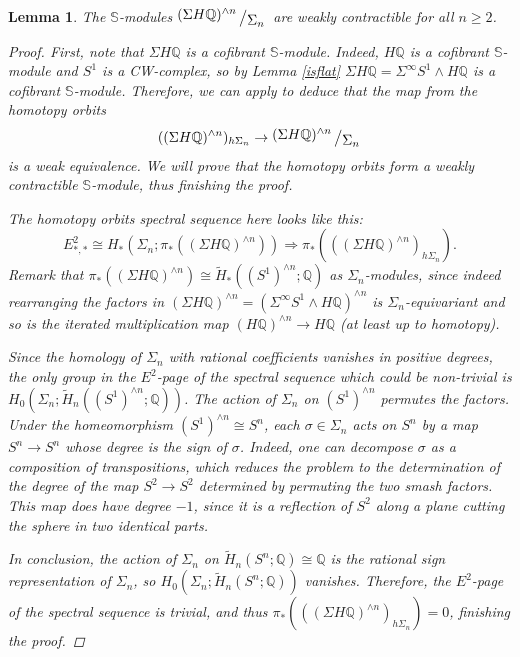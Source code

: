 \documentclass[a4paper,11pt]{amsart} %
\theoremstyle{definition} \newtheorem{defn}[equation]{Definition}
\theoremstyle{remark} \newtheorem{notation}[equation]{Notation}
\theoremstyle{plain} \newtheorem{teo}[equation]{Theorem}
\theoremstyle{plain} \newtheorem{lema}[equation]{Lemma}
\theoremstyle{plain} \newtheorem{prop}[equation]{Proposition}
\theoremstyle{plain} \newtheorem{corolario}[equation]{Corollary}
\theoremstyle{remark} \newtheorem{obs}[equation]{Remark}
\theoremstyle{remark} \newtheorem{sideobs}[equation]{Side remark}
\theoremstyle{remark} \newtheorem{ejercicio}[equation]{Exercise}
\theoremstyle{definition} \newtheorem{notn}[equation]{Notation}
\theoremstyle{remark} \newtheorem{ej}[equation]{Example}
\theoremstyle{remark} \newtheorem{contraej}[equation]{Counterexample}
\theoremstyle{plain} \newtheorem{conj}[equation]{Conjecture}
\renewcommand{\1}{\ensuremath{\mathbbm{1}}}
\newcommand{\Q}{\mathbb{Q}}
\renewcommand{\S}{\mathbb{S}}
\newcommand{\bigslant}[2]{{\raisebox{.2em}{$#1$}\left/\raisebox{-.2em}{$#2$}\right.}}
\numberwithin{equation}{section}
\newcommand{\sma}{\wedge}
\begin{document}
%
\begin{lema} \label{lema-htpyorbits} The $\S$-modules $\bigslant{(\Sigma H\Q)^{\sma n}}{\Sigma_n}$ are weakly contractible for all $n\geq 2$. %
\begin{proof}
First, note that $\Sigma H\Q$ is a cofibrant $\S$-module. Indeed, $H\Q$ is a cofibrant $\S$-module and $S^1$ is a CW-complex, so by Lemma \ref{isflat} $\Sigma H\Q=\Sigma^\infty S^1 \sma H\Q$ is a cofibrant $\S$-module. Therefore, we can apply \cite[III.5.1]{ekmm} to deduce that the map from the homotopy orbits \[((\Sigma H\Q)^{\sma n})_{h\Sigma_n} \to \bigslant{(\Sigma H\Q)^{\sma n}}{\Sigma_n}\] is a weak equivalence. We will prove that the homotopy orbits form a weakly contractible $\S$-module, thus finishing the proof. %

The homotopy orbits spectral sequence \cite[3.2]{tsalidis} here looks like this:
\[E^2_{*,*} \cong H_*(\Sigma_n; \pi_*((\Sigma H\Q)^{\sma n})) \Rightarrow \pi_*(((\Sigma H\Q)^{\sma n})_{h\Sigma_n}).\]
Remark that $\pi_*((\Sigma H\Q)^{\sma n}) \cong \widetilde{H}_*((S^1)^{\sma n}; \Q)$ as $\Sigma_n$-modules, since indeed rearranging the factors in $(\Sigma H\Q)^{\sma n}=(\Sigma^\infty S^1 \sma H\Q)^{\sma n}$ is $\Sigma_n$-equivariant and so is the iterated multiplication map $(H\Q)^{\sma n}\to H\Q$ (at least up to homotopy). %

Since the homology of $\Sigma_n$ with rational coefficients vanishes in positive degrees, %
the only group in the $E^2$-page of the spectral sequence which could be non-trivial is $H_0(\Sigma_n; \widetilde{H}_n((S^1)^{\sma n}; \Q))$. The action of $\Sigma_n$ on $(S^1)^{\sma n}$ permutes the factors. Under the homeomorphism $(S^1)^{\sma n}\cong S^n$, each $\sigma\in \Sigma_n$ acts on $S^n$ by a map $S^n\to S^n$ whose degree is the sign of $\sigma$. Indeed, one can decompose $\sigma$ as a composition of transpositions, which reduces the problem to the determination of the degree of the map $S^2\to S^2$ determined by permuting the two smash factors. This map does have degree $-1$, since it is a reflection of $S^2$ along a plane cutting the sphere in two identical parts. %

In conclusion, the action of $\Sigma_n$ on $\widetilde{H}_n(S^n;\Q)\cong \Q$ is the rational sign representation of $\Sigma_n$, so $H_0(\Sigma_n;\widetilde{H}_n(S^n;\Q))$ vanishes. %
Therefore, the $E^2$-page of the spectral sequence is trivial, and thus $\pi_*(((\Sigma H\Q)^{\sma n})_{h\Sigma_n})=0$, finishing the proof.
\end{proof}
\end{lema}
\end{document}
